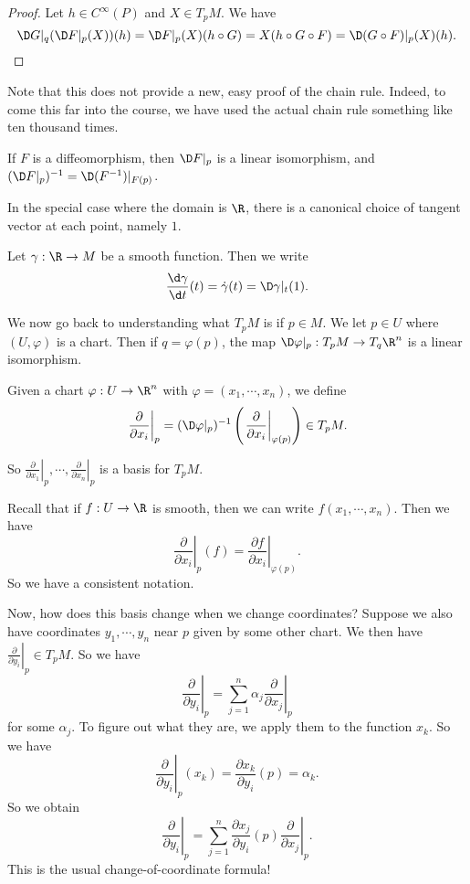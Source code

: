 \documentclass[a4paper]{article}
\begin{document}
\begin{proof}
  Let $h \in C^\infty(P)$ and $X \in T_p M$. We have
  \[
    \D G|_q (\D F|_p (X))(h) = \D F|_p(X) (h \circ G) = X(h \circ G \circ F) = \D (G \circ F)|_p (X)(h). \qedhere
  \]
\end{proof}
Note that this does not provide a new, easy proof of the chain rule. Indeed, to come this far into the course, we have used the actual chain rule something like ten thousand times.

\begin{cor}
  If $F$ is a diffeomorphism, then $\D F|_p$ is a linear isomorphism, and $(\D F|_p)^{-1} = \D (F^{-1})|_{F(p)}$.
\end{cor}

In the special case where the domain is $\R$, there is a canonical choice of tangent vector at each point, namely $1$.
\begin{defi}[Derivative]
  Let $\gamma: \R \to M$ be a smooth function. Then we write
  \[
    \frac{\d \gamma}{\d t}(t) = \dot{\gamma}(t) = \D \gamma|_t (1).
  \]
\end{defi}

We now go back to understanding what $T_pM$ is if $p \in M$. We let $p \in U$ where $(U, \varphi)$ is a chart. Then if $q = \varphi(p)$, the map $\D\varphi|_p: T_p M \to T_q \R^n$ is a linear isomorphism.

\begin{defi}
  Given a chart $\varphi: U \to \R^n$ with $\varphi = (x_1, \cdots, x_n)$, we define
  \[
    \left.\frac{\partial}{\partial x_i}\right|_p = (\D \varphi|_p)^{-1} \left(\left.\frac{\partial}{\partial x_i}\right|_{\varphi(p)}\right) \in T_p M.
  \]
\end{defi}
So $\left.\frac{\partial}{\partial x_1}\right|_p, \cdots, \left.\frac{\partial}{\partial x_n}\right|_p$ is a basis for $T_p M$.

Recall that if $f: U \to \R$ is smooth, then we can write $f(x_1, \cdots, x_n)$. Then we have
\[
  \left.\frac{\partial}{\partial x_i}\right|_p (f) = \left.\frac{\partial f}{\partial x_i}\right|_{\varphi(p)}.
\]
So we have a consistent notation.

Now, how does this basis change when we change coordinates? Suppose we also have coordinates $y_1, \cdots, y_n$ near $p$ given by some other chart. We then have $\left.\frac{\partial}{\partial y_i}\right|_p \in T_p M$. So we have
\[
  \left.\frac{\partial}{\partial y_i}\right|_p = \sum_{j = 1}^n \alpha_j \left.\frac{\partial}{\partial x_j}\right|_p
\]
for some $\alpha_j$. To figure out what they are, we apply them to the function $x_k$. So we have
\[
  \left.\frac{\partial}{\partial y_i}\right|_p (x_k) = \frac{\partial x_k}{\partial y_i}(p) = \alpha_k.
\]
So we obtain
\[
  \left.\frac{\partial}{\partial y_i}\right|_p = \sum_{j = 1}^n \frac{\partial x_j}{\partial y_i}(p)\left.\frac{\partial}{\partial x_j}\right|_p.
\]
This is the usual change-of-coordinate formula!
\end{document}
